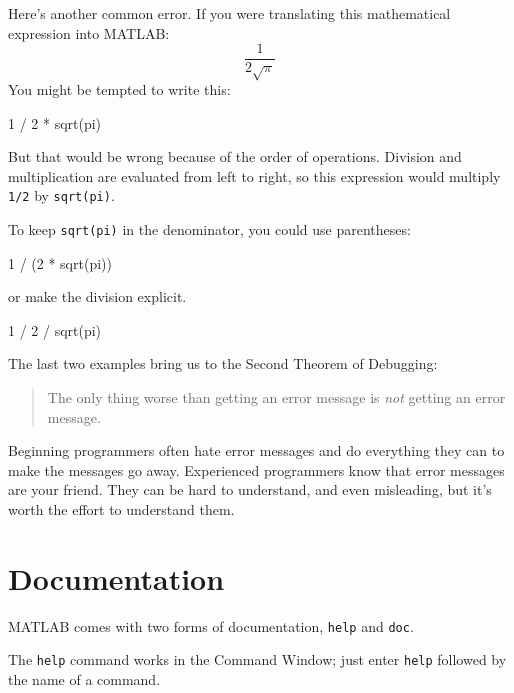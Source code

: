 
Here's another common error.
If you were translating this mathematical expression into MATLAB:
%
\[ \frac{1}{2 \sqrt \pi} \]
%
You might be tempted to write this:

\begin{code}
1 / 2 * sqrt(pi)
\end{code}

But that would be wrong because of the order of operations.  Division and multiplication are evaluated from left to right, so this expression would multiply \lstinline{1/2} by \lstinline{sqrt(pi)}.


To keep \lstinline{sqrt(pi)} in the denominator, you could use parentheses:

\begin{code}
1 / (2 * sqrt(pi))
\end{code}

or make the division explicit.

\begin{code}
1 / 2 / sqrt(pi)
\end{code}


The last two examples bring us to the Second Theorem of Debugging:

\begin{quote}
The only thing worse than getting an error message is \emph{not} getting an error message.
\end{quote}

Beginning programmers often hate error messages and do everything they
can to make the messages go away.  Experienced programmers know that error
messages are your friend.  They can be hard to understand, and even
misleading, but it's worth the effort to understand them.

\section{Documentation}

MATLAB comes with two forms of documentation, \lstinline{help}
and \lstinline{doc}.


The \lstinline{help} command works in the Command Window; just 
enter \lstinline{help} followed by the name of a command.

